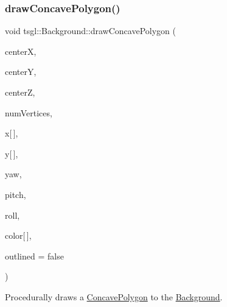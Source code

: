 \subsubsection{\texorpdfstring{draw\+Concave\+Polygon()}{drawConcavePolygon()}\hspace{0.1cm}{\footnotesize\ttfamily [2/2]}}
{\footnotesize\ttfamily void tsgl\+::\+Background\+::draw\+Concave\+Polygon (\begin{DoxyParamCaption}\item[{float}]{centerX,  }\item[{float}]{centerY,  }\item[{float}]{centerZ,  }\item[{int}]{num\+Vertices,  }\item[{float}]{x\mbox{[}$\,$\mbox{]},  }\item[{float}]{y\mbox{[}$\,$\mbox{]},  }\item[{float}]{yaw,  }\item[{float}]{pitch,  }\item[{float}]{roll,  }\item[{\hyperlink{structtsgl_1_1_color_float}{Color\+Float}}]{color\mbox{[}$\,$\mbox{]},  }\item[{bool}]{outlined = {\ttfamily false} }\end{DoxyParamCaption})\hspace{0.3cm}{\ttfamily [virtual]}}



Procedurally draws a \hyperlink{classtsgl_1_1_concave_polygon}{Concave\+Polygon} to the \hyperlink{classtsgl_1_1_background}{Background}. 

